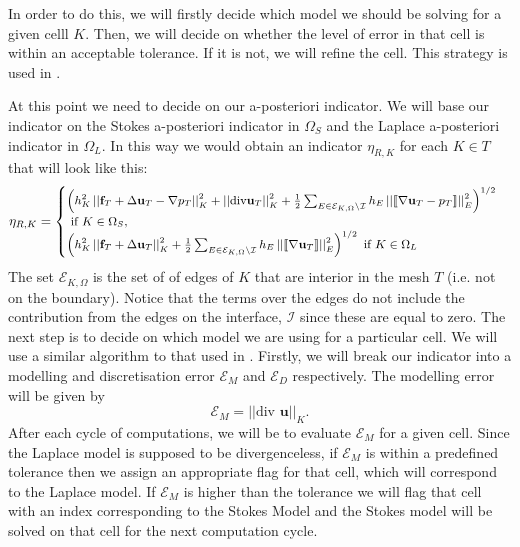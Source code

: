 \documentclass[12pt,a4paper]{article}
\theoremstyle{definition}
\begin{document}
 In order to do this, we will firstly  decide which model we should be solving for a given celll $K$.  Then, we will decide on whether the level of error in that cell is within an acceptable tolerance.  If it is not, we will refine the cell.  This strategy is used in \cite[\S6: Algorithm 6.1]{giesselmann2017posteriori}.  
 
At this point we need to decide on our a-posteriori indicator. We will base our indicator on the Stokes a-posteriori indicator in $\Omega_S$ and the Laplace a-posteriori indicator in $\Omega_L$.  In this way we would obtain an indicator $\eta_{R,K}$ for each $K\in T$ that will look like this:
\begin{equation}\small\label{approach1_indicator}
\eta_{R,K}=\begin{cases}
\left(h^2_K\left|\left|\textbf{f}_T+\Delta \textbf{u}_T-\nabla p_T\right|\right|^2_K+\left|\left|\text{div} \textbf{u}_T\right|\right|^2_K+\frac{1}{2}\sum_{E\in\mathcal{E}_{K,\Omega}\setminus\mathcal{I}}h_E\left|\left| \llbracket \nabla \textbf{u}_T -p_T \rrbracket \right|\right|_E^2\right)^{1/2} \\\text{ if }K\in\Omega_S,\\
\left(h^2_K\left|\left|\textbf{f}_T+\Delta \textbf{u}_T\right|\right|^2_K+\frac{1}{2}\sum_{E\in\mathcal{E}_{K,\Omega}\setminus\mathcal{I}}h_E\left|\left| \llbracket \nabla \textbf{u}_T  \rrbracket \right|\right|_E^2\right)^{1/2}\text{ if }K\in\Omega_L
\end{cases}
\end{equation}
The set $\mathcal{E}_{K,\Omega}$ is the set of of edges of $K$ that are interior in the mesh $T$ (i.e. not on the boundary).  Notice that the terms over the edges do not include the contribution from the edges on the interface, $\mathcal{I}$ since these are equal to zero.   The next step is to decide on which model we are using for  a particular cell.  We will use a similar algorithm to that used in \cite[\S 6: Algorithm 6.1]{giesselmann2017posteriori}.  Firstly, we will break our indicator into a modelling and discretisation error $\mathcal{E}_M$ and $\mathcal{E}_D$ respectively.   The modelling error will be given by 
\begin{equation}
\mathcal{E}_M= \left|\left|\text{div }\textbf{u}\right|\right|_K.
\end{equation}
After each cycle of computations, we will be to evaluate $\mathcal{E}_M$ for a given cell.  Since the Laplace model is supposed to be divergenceless, if $\mathcal{E}_M$ is within a predefined tolerance then we assign an appropriate flag for that cell, which will correspond to the Laplace model.  If $\mathcal{E}_M$ is higher than the tolerance we will flag that cell with an index corresponding to the Stokes Model and the Stokes model will be solved on that cell for the next computation cycle.  
\end{document}
